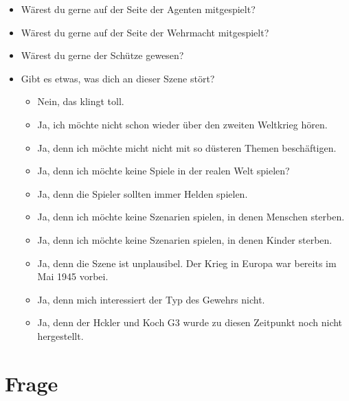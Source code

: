 \documentclass{article}
\newcommand\frage[1]{\section{Frage}\label{#1}}
\begin{document}
\begin{itemize}
\item  Wärest du gerne auf der Seite der Agenten mitgespielt?
\item  Wärest du gerne auf der Seite der Wehrmacht mitgespielt?
\item  Wärest du gerne der Schütze gewesen?
\item  Gibt es etwas, was dich an dieser Szene stört?
  \begin{itemize}
  \item Nein, das klingt toll.
  \item Ja, ich möchte nicht schon wieder über den zweiten Weltkrieg hören.
  \item Ja, denn ich möchte micht nicht mit so düsteren Themen beschäftigen.
  \item Ja, denn ich möchte keine Spiele in der realen Welt spielen?
  \item Ja, denn die Spieler sollten immer Helden spielen.
  \item Ja, denn ich möchte keine Szenarien spielen, in denen Menschen sterben.
  \item Ja, denn ich möchte keine Szenarien spielen, in denen Kinder sterben.
  \item Ja, denn die Szene ist unplausibel. Der Krieg in Europa war bereits im Mai 1945 vorbei.
  \item Ja, denn mich interessiert der Typ des Gewehrs nicht.
  \item Ja, denn der Hckler und Koch G3 wurde zu diesen Zeitpunkt noch nicht hergestellt.
  \end{itemize}
\end{itemize}

\frage{steampunk}
\end{document}
